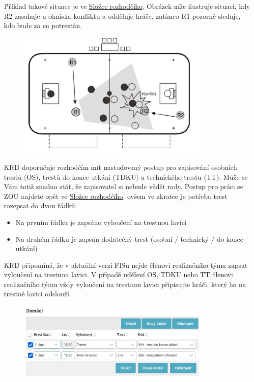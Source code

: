 \documentclass{newsletter}
\begin{document}
Příklad takové situace je ve \href{https://www.ceskyflorbal.cz/data/document/20240902/171344_86ae_Slozka-rozhodciho.pdf}{Složce rozhodčího}. Obrázek níže ilustruje situaci, kdy R2 zasahuje u ohniska konfliktu a odděluje hráče, zatímco R1 pozorně sleduje, kdo bude za co potrestán.

\begin{figure}[h]
	\centering
	\includegraphics[width=0.85\textwidth, keepaspectratio]{konflikt}
\end{figure}

\clearpage
KRD doporučuje rozhodčím mít nastudovaný postup pro zapisování osobních trestů (OS), trestů do konce utkání (TDKU) a technického trestu (TT). Může se Vám totiž snadno stát, že zapisovatel si nebude vědět rady. Postup pro práci se ZOU najdete opět ve \href{https://www.ceskyflorbal.cz/data/document/20240902/171344_86ae_Slozka-rozhodciho.pdf}{Složce rozhodčího}, ovšem ve zkratce je potřeba trest rozepsat do dvou řádků:
\begin{itemize}
	\item Na prvním řádku je zapsáno vyloučení na trestnou lavici
	\item Na druhém řádku je zapsán dodatečný trest (osobní / technický / do konce utkání) 
\end{itemize}
KRD připomíná, že v aktuální verzi FISu nejde členovi realizačního týmu zapsat vyloučení na trestnou lavici. V případě udělení OS, TDKU nebo TT členovi realizačního týmu vždy vyloučení na trestnou lavici připisujte hráči, který ho na trestné lavici odslouží.

\begin{figure}[h]
	\centering
	\includegraphics[width=0.85\textwidth, keepaspectratio]{zapsani_tdku_trener}
\end{figure}
\end{document}
